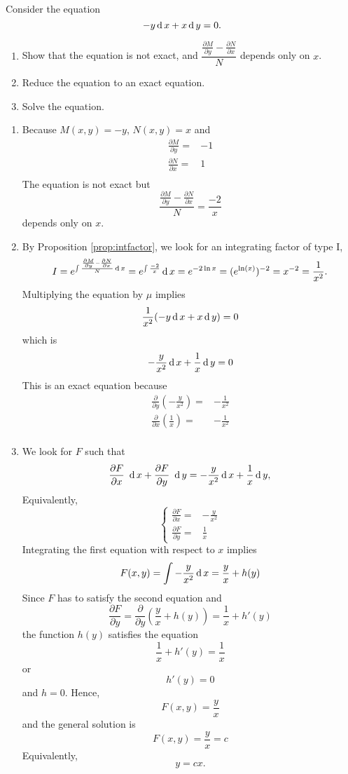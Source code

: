 \begin{exercise}
	Consider the equation
	\[ - y  \operatorname{d} x+ x \operatorname{d} y  =0. \]
	\begin{enumerate}
		\item  Show that the equation is not exact, and $\dfrac{\frac{\partial M}{\partial y} - \frac{\partial N}{\partial x}}{N}$ depends only on $x$.
		\item Reduce the equation to an exact equation.
		\item Solve the equation.
	\end{enumerate}
\end{exercise}
\begin{exersol}
	\begin{enumerate}
		\item Because $M(x, y)=-y$, $N(x, y)=x$ and 
		\[
		\begin{split}
		\frac{\partial M}{\partial y} =&-1 \\
		\frac{\partial N}{\partial x} =&1 \\
		\end{split}
		\]
		The equation is not exact but
		\[ \frac{\frac{\partial M}{\partial y} - \frac{\partial N}{\partial x}}{N}=  \frac{-2}{x}\] 
		depends only on $x$.
		\item By Proposition \ref{prop:intfactor}, 
			we look for an integrating factor of type I,
		\[  I= e^{\int \frac{\frac{\partial M}{\partial y} - \frac{\partial N}{\partial x}}{N}\operatorname{d} x} = e^{\int  \frac{-2}{x}} \operatorname{d} x=e^{-2\ln x}=(e^{\ln(x)})^{-2}=x^{-2}=\frac{1}{x^2}. \]
		Multiplying the equation by $\mu$ implies
		\[ \frac{1}{x^2} (- y  \operatorname{d} x+x \operatorname{d} y ) = 0  \]
		which is 
		\[ - \frac{y}{x^2}  \operatorname{d} x+\frac{1}{x} \operatorname{d} y  = 0  \]
		This is an exact equation because
		\[
		\begin{split}
		\frac{\partial}{\partial y} \left( - \frac{y}{x^2} \right) =&-\frac{1}{x^2} \\
		\frac{\partial}{\partial x} \left(\frac{1}{x}\right)=&-\frac{1}{x^2} \\
		\end{split}
		\]
		\item We look for $F$ such that 
		\[\frac{\partial F}{\partial x}  ~\operatorname{d} x+\frac{\partial F}{\partial y}~\operatorname{d} y=  - \frac{y}{x^2}  \operatorname{d} x+\frac{1}{x} \operatorname{d} y, \]
		Equivalently, 
		\[
		\begin{cases}
		\frac{\partial F}{\partial x}=& -\frac{y}{x^2}\\
		\frac{\partial F}{\partial y}=& \frac{1}{x}
		\end{cases}
		\]
		Integrating the first equation with respect to $x$ implies
		\[  
		F(x, y) = \int  -\frac{y}{x^2} \operatorname{d} x  =\frac{y}{x} + h(y)
		\]
		Since $F$ has to satisfy the second equation and 
		\[
		\frac{\partial F}{\partial y}= \frac{\partial}{\partial y} \left(\frac{y}{x} + h(y)\right) = \frac{1}{x} + h'(y)
		\]
		the function $h(y)$ satisfies the equation
		\[\frac{1}{x} + h'(y) =\frac{1}{x} \]
		or 
		\[ h'(y) =0 \]
		and $h=0$. Hence, 
		\[
		F(x, y)=  \frac{y}{x}
		\]
		and the general solution is 
		\[
		F(x, y)=  \frac{y}{x}=c
		\]
		Equivalently,
		\[
		y   = cx.
		\]
	\end{enumerate}
\end{exersol}

